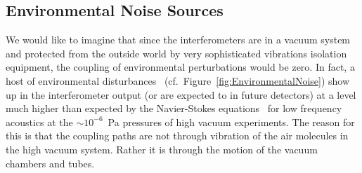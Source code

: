 






%





\subsection{Environmental Noise Sources}
\label{s:IDC:PEM}
We would like to imagine that since the interferometers are in a vacuum system and
protected from the outside world by very sophisticated vibrations
isolation equipment, the coupling of environmental perturbations would
be zero. In fact, a host of environmental
disturbances~\cite{Effler:2015hw, Acernese:2006dq}
(cf.~Figure~\ref{fig:EnvironmentalNoise}) show up in the
interferometer output (or are expected to in future detectors) at a
level much higher than expected by the Navier-Stokes
equations~\cite{Greenspan:sound} for low frequency acoustics at the
$\sim10^{-6}$~Pa pressures of high vacuum experiments. The reason for
this is that the coupling paths are not through vibration of the air
molecules in the high vacuum system. Rather it is through the motion of the vacuum chambers and tubes.

